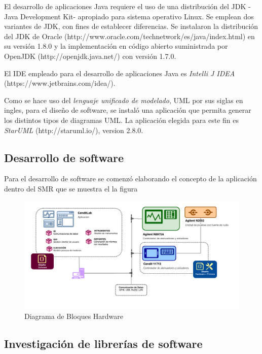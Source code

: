 \documentclass[paper=letter,oneside,fontsize=12pt, parskip=full]{article}
\begin{document}
	El desarrollo de aplicaciones Java requiere el uso de una distribución del JDK -Java Development Kit- apropiado para sistema operativo Linux. Se emplean dos variantes de JDK, con fines de establecer diferencias. Se instalaron la distribución del JDK de Oracle (http://www.oracle.com/technetwork/es/java/index.html) en  su versión 1.8.0 y la implementación en código abierto  suministrada por OpenJDK (http://openjdk.java.net/) con versión 1.7.0.
	
	El IDE empleado para el desarrollo de aplicaciones Java es \emph{Intelli J IDEA} (https://www.jetbrains.com/idea/).
	
	Como se hace uso del \emph{lenguaje unificado de modelado}, UML por sus siglas en ingles, para el diseño de software, se instaló una aplicación que permita generar los distintos tipos de diagramas UML. La aplicación elegida para este fin es \emph{StarUML} (http://staruml.io/), version 2.8.0.
	
	\subsection{Desarrollo de software}
	
	Para el desarrollo de software se comenzó elaborando el concepto de la aplicación dentro del SMR que se muestra el la figura 
	
	\begin{figure}[!h]
		\begin{center}
			\includegraphics[width=18cm]{Imagenes/SystemMainDiagram.pdf}
			\caption{Diagrama de Bloques Hardware}
			\label{Fig:Diagrama de Bloques de Hardware}
		\end{center}
	\end{figure}		
	

	\subsection{Investigación de librerías de software}
	
\end{document}
